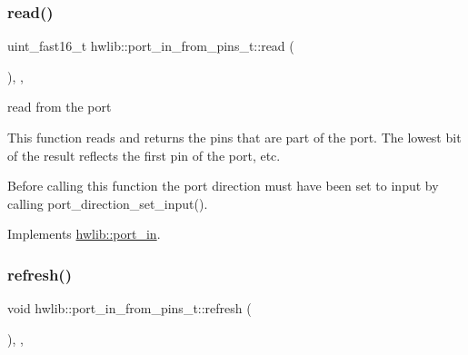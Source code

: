 \mbox{\label{classhwlib_1_1port__in__from__pins__t_a6a9d78c84eb3f7bbf0de76f39d5d7d04}} 
\subsubsection{\texorpdfstring{read()}{read()}}
{\footnotesize\ttfamily uint\+\_\+fast16\+\_\+t hwlib\+::port\+\_\+in\+\_\+from\+\_\+pins\+\_\+t\+::read (\begin{DoxyParamCaption}{ }\end{DoxyParamCaption})\hspace{0.3cm}{\ttfamily [inline]}, {\ttfamily [override]}, {\ttfamily [virtual]}}





read from the port

This function reads and returns the pins that are part of the port. The lowest bit of the result reflects the first pin of the port, etc.

Before calling this function the port direction must have been set to input by calling port\+\_\+direction\+\_\+set\+\_\+input(). 

Implements \hyperlink{classhwlib_1_1port__in_aa3aa277f9448c3ee493c56f05beb2ddb}{hwlib\+::port\+\_\+in}.

\mbox{\label{classhwlib_1_1port__in__from__pins__t_a07ed96c246cae9499ed61a20916fe643}} 
\subsubsection{\texorpdfstring{refresh()}{refresh()}}
{\footnotesize\ttfamily void hwlib\+::port\+\_\+in\+\_\+from\+\_\+pins\+\_\+t\+::refresh (\begin{DoxyParamCaption}{ }\end{DoxyParamCaption})\hspace{0.3cm}{\ttfamily [inline]}, {\ttfamily [override]}, {\ttfamily [virtual]}}





